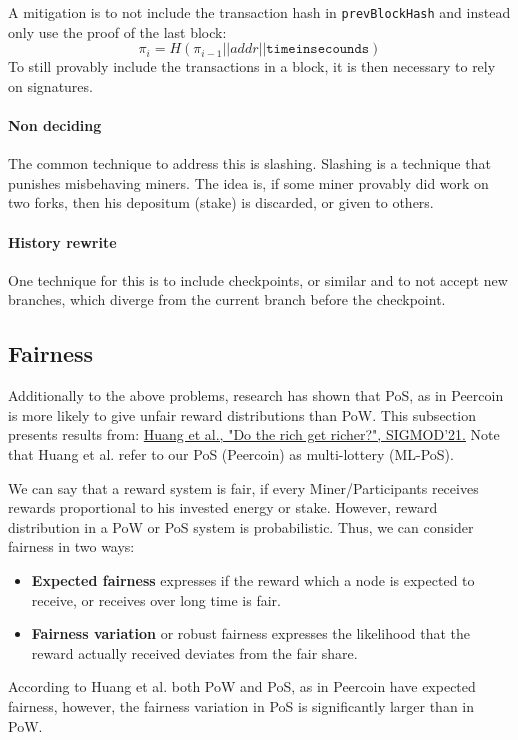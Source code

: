 A mitigation is to not include the transaction hash in \texttt{prevBlockHash} and instead only use the proof of the last block:
\[
	\pi_{i} = H(\pi_{i-1}||addr||\texttt{timeinsecounds})
\]
To still provably include the transactions in a block, it is then necessary to rely on signatures.

\paragraph*{Non deciding} 
The common technique to address this is slashing.
Slashing is a technique that punishes misbehaving miners.
The idea is, if some miner provably did work on two forks, then his depositum (stake) is discarded, or given to others.

\paragraph*{History rewrite}
One technique for this is to include checkpoints, or similar and to not accept new branches, which diverge from the current branch before the checkpoint.


\subsection{Fairness}
Additionally to the above problems, research has shown that PoS, as in Peercoin is more likely to give unfair reward distributions than PoW. This subsection presents results from:
\href{https://arxiv.org/pdf/2103.14713.pdf}{Huang et al., "Do the rich get richer?", SIGMOD'21.}
Note that Huang et al. refer to our PoS (Peercoin) as multi-lottery (ML-PoS).

\begin{definition}
We can say that a reward system is fair, if every Miner/Participants receives rewards proportional to his invested energy or stake.
However, reward distribution in a PoW or PoS system is probabilistic. Thus, we can consider fairness in two ways:
\begin{itemize}
	\item \textbf{Expected fairness} expresses if the reward which a node is expected to receive, or receives over long time is fair.
	\item \textbf{Fairness variation} or robust fairness expresses the likelihood that the reward actually received deviates from the fair share.
\end{itemize}
\end{definition}


\begin{theorem}
According to Huang et al. both PoW and PoS, as in Peercoin have expected fairness, however, the fairness variation in PoS is significantly larger than in PoW.
\end{theorem}